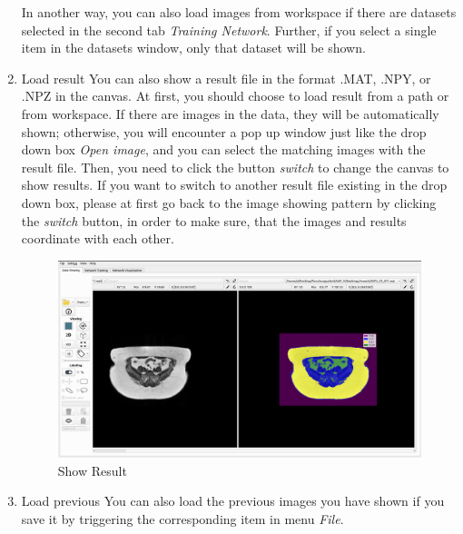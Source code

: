 \documentclass[12pt]{article}
\begin{document}
\begin{enumerate}
	In another way, you can also load images from workspace if there are datasets selected in the second tab \textit{Training Network}. Further, if you select a single item in the datasets window, only that dataset will be shown. 
	\item Load result
	\newline You can also show a result file in the format .MAT, .NPY, or .NPZ in the canvas. At first, you should choose to load result from a path or from workspace. If there are images in the data, they will be automatically shown; otherwise, you will encounter a pop up window just like the drop down box \textit{Open image}, and you can select the matching images with the result file. Then, you need to click the button \textit{switch} to change the canvas to show results. If you want to switch to another result file existing in the drop down box, please at first go back to the image showing pattern by clicking the \textit{switch} button, in order to make sure, that the images and results coordinate with each other.
	\begin{figure}[htbp]	
		\centering
		\includegraphics[width=\textwidth]{show_result.png}
		\caption[Show Result]{Show Result}
		\label{fig:show_result}
	\end{figure}
	\item Load previous
	\newline You can also load the previous images you have shown if you save it by triggering the corresponding item in menu \textit{File}.
\end{enumerate}
\end{document}

